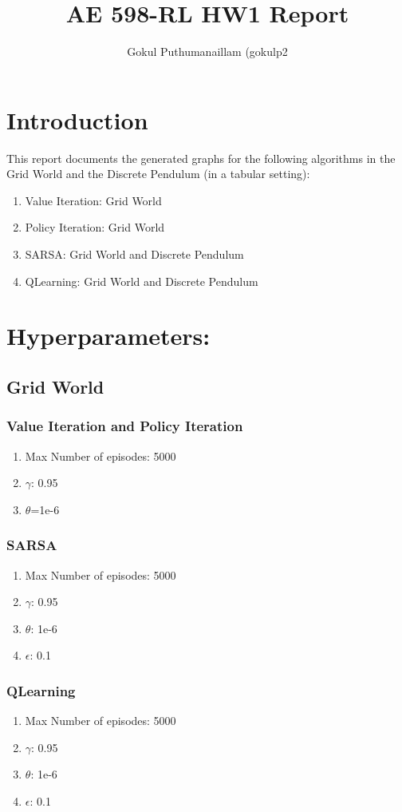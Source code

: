 \documentclass[conf]{new-aiaa}
\title{AE 598-RL HW1 Report}
\author{Gokul Puthumanaillam (gokulp2}
\affil{Department of Aerospace Engineering, University of Illinois Urbana-Champaign}
\begin{document}
\maketitle


\section{Introduction}
This report documents the generated graphs for the following algorithms in the Grid World and the Discrete Pendulum (in a tabular setting):
\begin{enumerate}
    \item Value Iteration: Grid World
    \item Policy Iteration: Grid World
    \item SARSA: Grid World and Discrete Pendulum
    \item QLearning: Grid World and Discrete Pendulum
\end{enumerate}
\section{Hyperparameters:}
\subsection{Grid World}
\subsubsection{Value Iteration and Policy Iteration}
\begin{enumerate}
    \item Max Number of episodes: 5000
    \item $\gamma$: 0.95
    \item $\theta$=1e-6
\end{enumerate}


\subsubsection{SARSA}
\begin{enumerate}
    \item Max Number of episodes: 5000
    \item $\gamma$: 0.95
    \item $\theta$: 1e-6
    \item $\epsilon$: 0.1
\end{enumerate}

\subsubsection{QLearning}
\begin{enumerate}
    \item Max Number of episodes: 5000
    \item $\gamma$: 0.95
    \item $\theta$: 1e-6
    \item $\epsilon$: 0.1
\end{enumerate}
\end{document}

